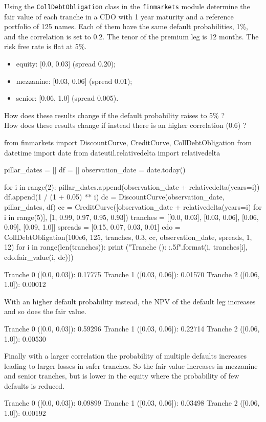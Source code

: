 \begin{question}
Using the \texttt{CollDebtObligation} class in the \texttt{finmarkets} module determine the fair value of each tranche in a CDO with 1 year maturity and a reference portfolio of 125 names. Each of them have the same default probabilities, 1\%, and the correlation is set to 0.2. The tenor of the premium leg is 12 months. The risk free rate is flat at 5\%.
\begin{itemize}
	\item equity: [0.0, 0.03] (spread 0.20);
	\item mezzanine: [0.03, 0.06] (spread 0.01);
	\item senior: [0.06, 1.0] (spread 0.005).
\end{itemize}
How does these results change if the default probability raises to 5\% ? \\
How does these results change if instead there is an higher correlation (0.6) ?
\end{question}

\cprotEnv\begin{solution}

\begin{ipython}
from finmarkets import DiscountCurve, CreditCurve, CollDebtObligation
from datetime import date
from dateutil.relativedelta import relativedelta

pillar_dates = []
df = []
observation_date = date.today()

for i in range(2):
    pillar_dates.append(observation_date + relativedelta(years=i))
    df.append(1 / (1 + 0.05) ** i)
    dc = DiscountCurve(observation_date, pillar_dates, df)
cc = CreditCurve([observation_date + relativedelta(years=i) for i in range(5)],
    [1, 0.99, 0.97, 0.95, 0.93])
tranches = [[0.0, 0.03], [0.03, 0.06], [0.06, 0.09], [0.09, 1.0]]
spreads = [0.15, 0.07, 0.03, 0.01]
cdo = CollDebtObligation(100e6, 125, tranches, 0.3, cc,
    observation_date, spreads, 1, 12)
for i in range(len(tranches)):
    print ("Tranche {} ({}): {:.5f}".format(i, tranches[i], cdo.fair_value(i, dc)))
\end{ipython}
\begin{ioutput}
Tranche 0 ([0.0, 0.03]): 0.17775
Tranche 1 ([0.03, 0.06]): 0.01570
Tranche 2 ([0.06, 1.0]): 0.00012
\end{ioutput}
With an higher default probability instead, the NPV of the default leg increases and so does the fair value.

\begin{ioutput}
Tranche 0 ([0.0, 0.03]): 0.59296
Tranche 1 ([0.03, 0.06]): 0.22714
Tranche 2 ([0.06, 1.0]): 0.00530
\end{ioutput}
Finally with a larger correlation the probability of multiple defaults increases leading to larger losses in safer tranches. So the fair value increases in mezzanine and senior tranches, but is lower in the equity where the probability of few defaults is reduced.

\begin{ioutput}
Tranche 0 ([0.0, 0.03]): 0.09899
Tranche 1 ([0.03, 0.06]): 0.03498
Tranche 2 ([0.06, 1.0]): 0.00192
\end{ioutput}
\end{solution}
